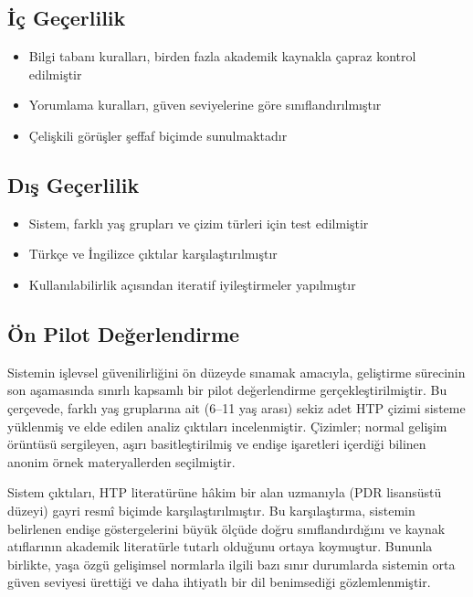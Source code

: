 \subsection{İç Geçerlilik}

\begin{itemize}
  \item Bilgi tabanı kuralları, birden fazla akademik kaynakla çapraz kontrol edilmiştir
  \item Yorumlama kuralları, güven seviyelerine göre sınıflandırılmıştır
  \item Çelişkili görüşler şeffaf biçimde sunulmaktadır
\end{itemize}

\subsection{Dış Geçerlilik}

\begin{itemize}
  \item Sistem, farklı yaş grupları ve çizim türleri için test edilmiştir
  \item Türkçe ve İngilizce çıktılar karşılaştırılmıştır
  \item Kullanılabilirlik açısından iteratif iyileştirmeler yapılmıştır
\end{itemize}

\subsection{Ön Pilot Değerlendirme}

Sistemin işlevsel güvenilirliğini ön düzeyde sınamak amacıyla, geliştirme sürecinin son aşamasında sınırlı kapsamlı bir pilot değerlendirme gerçekleştirilmiştir. Bu çerçevede, farklı yaş gruplarına ait (6--11 yaş arası) sekiz adet HTP çizimi sisteme yüklenmiş ve elde edilen analiz çıktıları incelenmiştir. Çizimler; normal gelişim örüntüsü sergileyen, aşırı basitleştirilmiş ve endişe işaretleri içerdiği bilinen anonim örnek materyallerden seçilmiştir.

Sistem çıktıları, HTP literatürüne hâkim bir alan uzmanıyla (PDR lisansüstü düzeyi) gayri resmî biçimde karşılaştırılmıştır. Bu karşılaştırma, sistemin belirlenen endişe göstergelerini büyük ölçüde doğru sınıflandırdığını ve kaynak atıflarının akademik literatürle tutarlı olduğunu ortaya koymuştur. Bununla birlikte, yaşa özgü gelişimsel normlarla ilgili bazı sınır durumlarda sistemin orta güven seviyesi ürettiği ve daha ihtiyatlı bir dil benimsediği gözlemlenmiştir.

